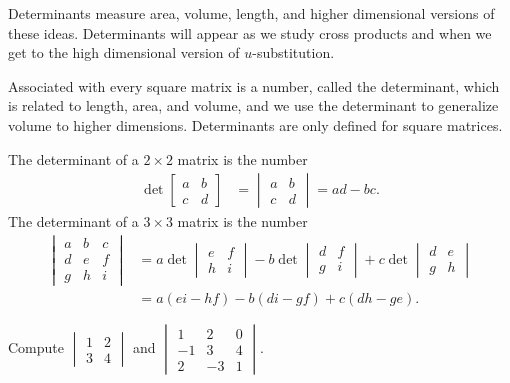 Determinants measure area, volume, length, and higher dimensional versions of these ideas.  Determinants will appear as we study cross products and when we get to the high dimensional version of {$u$}-substitution.


Associated with every square matrix is a number, called the determinant, which is related to length, area, and volume, and we use the determinant to generalize volume to higher dimensions. Determinants are only defined for square matrices.
\begin{definition}
The determinant of a {$2\times 2$} matrix is the number 
\begin{align*}
\det\begin{bmatrix}a&b\\c&d\end{bmatrix} &=\begin{vmatrix}a&b\\c&d\end{vmatrix} = ad-bc.
\end{align*}
The determinant of a {$3\times 3$} matrix is the number 
\begin{align*}
\begin{vmatrix}a&b&c\\d&e&f\\g&h&i\end{vmatrix} &= a\det\begin{vmatrix}e&f\\h&i\end{vmatrix} -b\det\begin{vmatrix}d&f\\g&i\end{vmatrix} +c\det\begin{vmatrix}d&e\\g&h\end{vmatrix}\\
&=a(ei-hf)-b(di-gf)+c(dh-ge).
\end{align*}
\end{definition}

\begin{problem}
Compute 
$\begin{vmatrix}
1&2\\
3&4
\end{vmatrix} 
$
and 
$\begin{vmatrix}
1&2&0\\
-1&3&4\\
2&-3&1
\end{vmatrix} 
$.
\end{problem}

